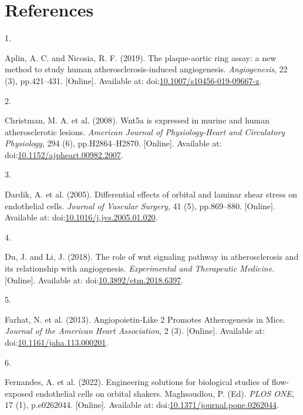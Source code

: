 \documentclass[
  11pt,
]{article}
\newlength{\cslhangindent}
\newlength{\csllabelwidth}
\newlength{\cslentryspacingunit} %
\newenvironment{CSLReferences}[2] %
 {%
  \setlength{\parindent}{0pt}
  \ifodd #1
  \let\oldpar\par
  \def\par{\hangindent=\cslhangindent\oldpar}
  \fi
  \setlength{\parskip}{#2\cslentryspacingunit}
 }%
 {}
\newcommand{\CSLLeftMargin}[1]{\parbox[t]{\csllabelwidth}{#1}}
\newcommand{\CSLRightInline}[1]{\parbox[t]{\linewidth - \csllabelwidth}{#1}\break}
\begin{document}
\hypertarget{references}{%
\section{References}\label{references}}

\footnotesize

\hypertarget{refs}{}
\begin{CSLReferences}{0}{0}
\leavevmode{}%
\CSLLeftMargin{1. }
\CSLRightInline{Aplin, A. C. and Nicosia, R. F. (2019). {The plaque-aortic ring assay: a new method to study human atherosclerosis-induced angiogenesis}. \emph{Angiogenesis}, 22 (3), pp.421--431. {[}Online{]}. Available at: doi:\href{https://doi.org/10.1007/s10456-019-09667-z}{10.1007/s10456-019-09667-z}.}

\leavevmode{}%
\CSLLeftMargin{2. }
\CSLRightInline{Christman, M. A. {et al.} (2008). {Wnt5a is expressed in murine and human atherosclerotic lesions}. \emph{American Journal of Physiology-Heart and Circulatory Physiology}, 294 (6), pp.H2864--H2870. {[}Online{]}. Available at: doi:\href{https://doi.org/10.1152/ajpheart.00982.2007}{10.1152/ajpheart.00982.2007}.}

\leavevmode{}%
\CSLLeftMargin{3. }
\CSLRightInline{Dardik, A. {et al.} (2005). {Differential effects of orbital and laminar shear stress on endothelial cells}. \emph{Journal of Vascular Surgery}, 41 (5), pp.869--880. {[}Online{]}. Available at: doi:\href{https://doi.org/10.1016/j.jvs.2005.01.020}{10.1016/j.jvs.2005.01.020}.}

\leavevmode{}%
\CSLLeftMargin{4. }
\CSLRightInline{Du, J. and Li, J. (2018). {The role of wnt signaling pathway in atherosclerosis and its relationship with angiogenesis}. \emph{Experimental and Therapeutic Medicine}. {[}Online{]}. Available at: doi:\href{https://doi.org/10.3892/etm.2018.6397}{10.3892/etm.2018.6397}.}

\leavevmode{}%
\CSLLeftMargin{5. }
\CSLRightInline{Farhat, N. {et al.} (2013). {Angiopoietin{-}Like 2 Promotes Atherogenesis in Mice}. \emph{Journal of the American Heart Association}, 2 (3). {[}Online{]}. Available at: doi:\href{https://doi.org/10.1161/jaha.113.000201}{10.1161/jaha.113.000201}.}

\leavevmode{}%
\CSLLeftMargin{6. }
\CSLRightInline{Fernandes, A. {et al.} (2022). {Engineering solutions for biological studies of flow-exposed endothelial cells on orbital shakers}. Maghsoudlou, P. (Ed). \emph{PLOS ONE}, 17 (1), p.e0262044. {[}Online{]}. Available at: doi:\href{https://doi.org/10.1371/journal.pone.0262044}{10.1371/journal.pone.0262044}.}


\end{CSLReferences}
\end{document}
